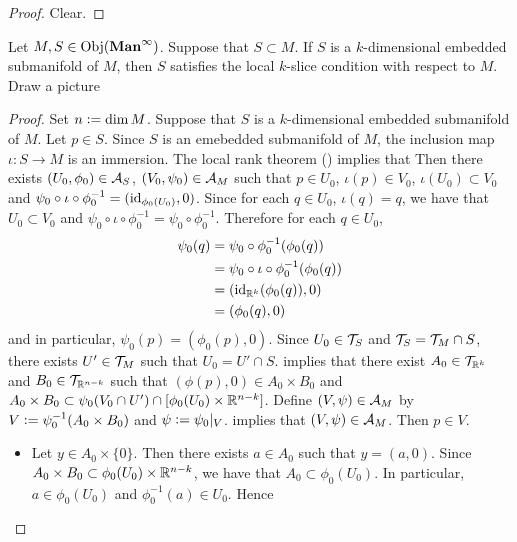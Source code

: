 \documentclass{book}
\begin{document}
	\begin{proof}
		Clear. 
	\end{proof}

	\begin{ex}
		Let $M,S \in \operatorname{Obj}(\operatorname*{\text{\textbf{Man}}^{\infty}})$. Suppose that $S \subset M$. If $S$ is a $k$-dimensional embedded submanifold of $M$, then $S$ satisfies the local $k$-slice condition with respect to $M$. \\
		 Draw a picture
	\end{ex}

	\begin{proof}
		Set $n \vcentcolon= \dim M$. Suppose that $S$ is a $k$-dimensional embedded submanifold of $M$. Let $p \in S$. Since $S$ is an emebedded submanifold of $M$, the inclusion map $\iota: S \rightarrow M$ is an immersion. The local rank theorem () implies that Then there exists $(U_0, \phi_0) \in \mathcal{A}_S$, $(V_0, \psi_0) \in \mathcal{A}_M$ such that $p \in U_0$, $\iota(p) \in V_0$, $\iota(U_0) \subset V_0$ and $\psi_0 \circ \iota \circ \phi_0^{-1} = (\operatorname{id}_{\phi_0(U_0)}, 0)$. Since for each $q \in U_0$, $\iota(q) = q$, we have that $U_0 \subset V_0$ and $\psi_0 \circ \iota \circ \phi_0^{-1} = \psi_0 \circ \phi_0^{-1}$. Therefore for each $q \in U_0$,
		\begin{align*}
			\psi_0(q)
			& =  \psi_0 \circ \phi_0^{-1} (\phi_0(q)) \\
			& = \psi_0 \circ \iota \circ \phi_0^{-1} (\phi_0(q)) \\
			& = (\operatorname{id}_{\mathbb{R}^k}(\phi_0(q)), 0) \\
			& = (\phi_0(q), 0)
		\end{align*}
		and in particular, $\psi_0(p) = (\phi_0(p), 0)$. Since $U_0 \in \mathcal{T}_S$ and $\mathcal{T}_S = \mathcal{T}_M \cap S$, there exists $U' \in \mathcal{T}_M$ such that $U_0 = U' \cap S$.  implies that there exist $A_0 \in \mathcal{T}_{\mathbb{R}^k}$ and $B_0 \in \mathcal{T}_{\mathbb{R}^{n-k}}$ such that $(\phi(p), 0) \in A_0 \times B_0$ and $A_0 \times B_0 \subset \psi_0(V_0 \cap U') \cap [\phi_0(U_0) \times \mathbb{R}^{n-k}]$. Define $(V, \psi) \in \mathcal{A}_{M}$ by $V \vcentcolon= \psi_0^{-1}(A_0 \times B_0)$ and $\psi \vcentcolon= \psi_0|_V$.  implies that $(V, \psi) \in \mathcal{A}_M$. Then $p \in V$. 
		\begin{itemize}
			\item Let $y \in A_0 \times \{0\}$. Then there exists $a \in A_0$ such that $y = (a,0)$. Since $A_0 \times B_0 \subset \phi_0(U_0) \times \mathbb{R}^{n-k}$, we have that $A_0 \subset \phi_0(U_0)$. In particular, $a \in \phi_0(U_0)$ and $\phi_0^{-1}(a) \in U_0$. Hence

\end{itemize}
\end{proof}
\end{document}

